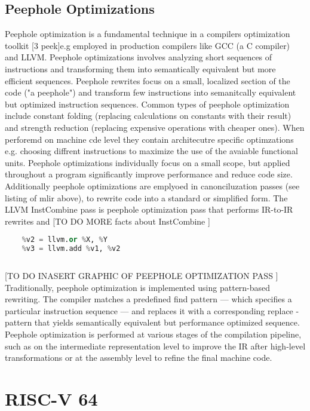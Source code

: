\subsection{Peephole Optimizations}
Peephole optimization is a fundamental technique in a compilers optimization toolkit [3 peek]e.g employed in production compilers like GCC (a C compiler) and LLVM. Peephole optimizations involves analyzing short sequences of instructions and transforming them into semantically equivalent but more efficient sequences.  Peephole rewrites focus on a small, localized section of the code ("a peephole")  and transform few instructions into semanitcally equivalent but optimized instruction sequences. Common types of peephole optimization include constant folding (replacing calculations on constants with their result) and strength reduction (replacing expensive operations with cheaper ones). When perforemd on machine cde level they contain architecutre specific optimzations e.g. choosing diffrent instructions to maximize the use of the avaiable functional units. Peephole optimizations individually focus on a small scope, but  applied throughout a program significantly improve performance and reduce code size. Additionally peephole optimizations are emplyoed in canonciluzation passes (see listing of mlir above), to rewrite code into a standard or simplified form. The LLVM InstCombine pass is peephole optimization pass that performs IR-to-IR rewrites and  [TO DO MORE facts about InstCombine ]
 \begin{lstlisting}[language=Python, caption=unoptimized IR instruction sequence]
    %v1 = llvm.and %X, %Y
    %v2 = llvm.or %X, %Y
    %v3 = llvm.add %v1, %v2
\end{lstlisting}
 \begin{lstlisting}[language=Python, caption= peephole optimized IR instruction sequence ]
 %v3 = llvm.add %X, %Y
\end{lstlisting}
 [TO DO INASERT GRAPHIC OF PEEPHOLE OPTIMIZATION PASS ]
 Traditionally, peephole optimization is implemented using pattern-based rewriting. The compiler matches a predefined find pattern — which specifies a particular instruction sequence — and replaces it with a corresponding replace - pattern that yields semantically equivalent but performance optimized sequence. Peephole optimization is performed at various stages of the compilation pipeline, such as on the intermediate representation level to improve the IR after high-level transformations or at the assembly level to refine the final machine code.
\section {RISC-V 64}
